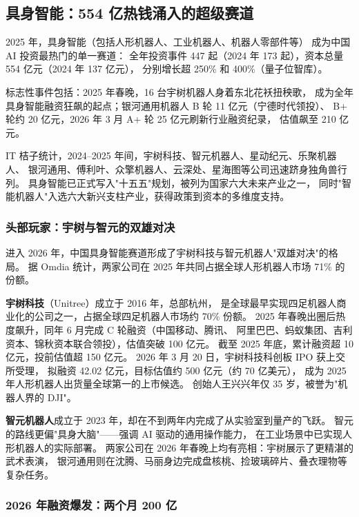 \subsection{具身智能：554 亿热钱涌入的超级赛道}
\label{subsec:china-embodied}

2025 年，具身智能（包括人形机器人、工业机器人、机器人零部件等）
成为中国 AI 投资最热门的单一赛道：
全年投资事件 447 起（2024 年 173 起），资本总量 554 亿元（2024 年 137 亿元），
分别增长超 250\% 和 400\%（量子位智库）。

标志性事件包括：2025 年春晚，16 台宇树机器人身着东北花袄扭秧歌，
成为全年具身智能融资狂飙的起点；银河通用机器人 B 轮 11 亿元（宁德时代领投）、
B+ 轮约 20 亿元，2026 年 3 月 A+ 轮 25 亿元刷新行业融资纪录，
估值飙至 210 亿元。

IT 桔子统计，2024--2025 年间，宇树科技、智元机器人、星动纪元、乐聚机器人、
银河通用、傅利叶、众擎机器人、云深处、星海图等公司迅速跻身独角兽行列。
具身智能已正式写入"十五五"规划，被列为国家六大未来产业之一，
同时"智能机器人"入选六大新兴支柱产业，获得政策到资本的多维度支持。

\subsubsection{头部玩家：宇树与智元的双雄对决}

进入 2026 年，中国具身智能赛道形成了宇树科技与智元机器人"双雄对决"的格局。
据 Omdia 统计，两家公司在 2025 年共同占据全球人形机器人市场 71\% 的份额。

\textbf{宇树科技}（Unitree）成立于 2016 年，总部杭州，
是全球最早实现四足机器人商业化的公司之一，占据全球四足机器人市场约 70\% 份额。
2025 年春晚出圈后热度飙升，同年 6 月完成 C 轮融资（中国移动、腾讯、
阿里巴巴、蚂蚁集团、吉利资本、锦秋资本联合领投），估值突破 100 亿元。
截至 2025 年底，累计融资超 10 亿元，投前估值超 150 亿元。
2026 年 3 月 20 日，宇树科技科创板 IPO 获上交所受理，
拟融资 42.02 亿元，目标估值约 500 亿元（约 70 亿美元），
成为 2025 年人形机器人出货量全球第一的上市候选。
创始人王兴兴年仅 35 岁，被誉为"机器人界的 DJI"。

\textbf{智元机器人}成立于 2023 年，却在不到两年内完成了从实验室到量产的飞跃。
智元的路线更偏"具身大脑"——强调 AI 驱动的通用操作能力，
在工业场景中已实现人形机器人的实际部署。
两家公司在 2026 年春晚上均有亮相：宇树展示了更精湛的武术表演，
银河通用则在沈腾、马丽身边完成盘核桃、捡玻璃碎片、叠衣理物等复杂任务。

\subsubsection{2026 年融资爆发：两个月 200 亿}

